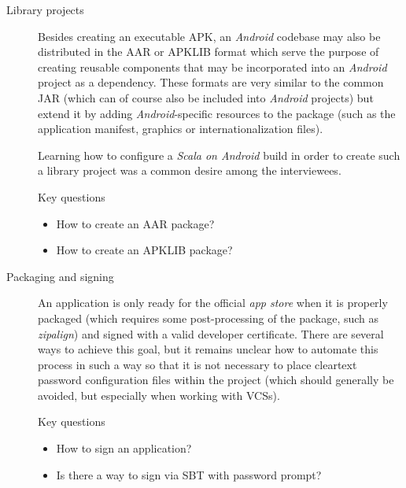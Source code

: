 \begin{description}
	\item[Library projects]\hfill

	Besides creating an executable \ac{APK}, an \textit{Android} codebase may also be distributed in the \ac{AAR} or \ac{APKLIB} format which serve the purpose of creating reusable components that may be incorporated into an \textit{Android} project as a dependency. These formats are very similar to the common \ac{JAR} (which can of course also be included into \textit{Android} projects) but extend it by adding \textit{Android}-specific resources to the package (such as the application manifest, graphics or internationalization files).

	Learning how to configure a \textit{Scala on Android} build in order to create such a library project was a common desire among the interviewees.

	\begin{highlight}{Key questions}

		\begin{itemize}

			\item How to create an \ac{AAR} package?

			\item How to create an \ac{APKLIB} package?

		\end{itemize}

	\end{highlight}

	\item[Packaging and signing]\hfill

	An application is only ready for the official \textit{app store} when it is properly packaged (which requires some post-processing of the package, such as \textit{zipalign}) and signed with a valid developer certificate. There are several ways to achieve this goal, but it remains unclear how to automate this process in such a way so that it is not necessary to place cleartext password configuration files within the project (which should generally be avoided, but especially when working with \acp{VCS}).

	\begin{highlight}{Key questions}

		\begin{itemize}

			\item How to sign an application?

			\item Is there a way to sign via \ac{SBT} with password prompt?


\end{itemize}
\end{highlight}
\end{description}

